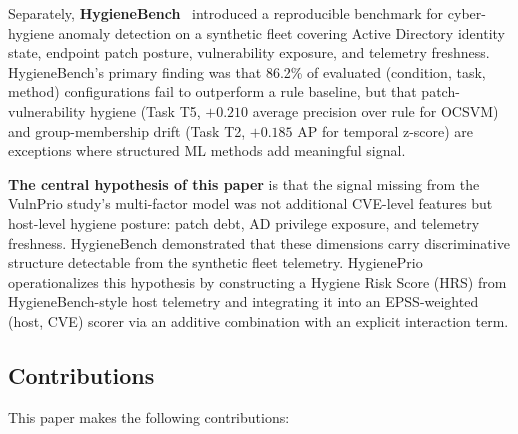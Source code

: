 Separately, \textbf{HygieneBench}~\cite{paper3hygienebench} introduced a reproducible benchmark for cyber-hygiene anomaly detection on a synthetic fleet covering Active Directory identity state, endpoint patch posture, vulnerability exposure, and telemetry freshness. HygieneBench's primary finding was that 86.2\% of evaluated (condition, task, method) configurations fail to outperform a rule baseline, but that patch-vulnerability hygiene (Task T5, $+0.210$ average precision over rule for OCSVM) and group-membership drift (Task T2, $+0.185$ AP for temporal z-score) are exceptions where structured ML methods add meaningful signal.

\textbf{The central hypothesis of this paper} is that the signal missing from the VulnPrio study's multi-factor model was not additional CVE-level features but host-level hygiene posture: patch debt, AD privilege exposure, and telemetry freshness. HygieneBench demonstrated that these dimensions carry discriminative structure detectable from the synthetic fleet telemetry. HygienePrio operationalizes this hypothesis by constructing a Hygiene Risk Score (HRS) from HygieneBench-style host telemetry and integrating it into an EPSS-weighted (host, CVE) scorer via an additive combination with an explicit interaction term.

\subsection{Contributions}

This paper makes the following contributions:

